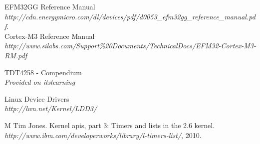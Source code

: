 
\begin{thebibliography}{9}

  EFM32GG Reference Manual\\
  \emph{http://cdn.energymicro.com/dl/devices/pdf/d0053\_efm32gg\_reference\_manual.pdf}.\\

 Cortex-M3 Reference Manual\\
	\emph{http://www.silabs.com/Support\%20Documents/TechnicalDocs/EFM32-Cortex-M3-RM.pdf}

 TDT4258 - Compendium\\
	\emph{Provided on itslearning}

 Linux Device Drivers \\
	\emph{http://lwn.net/Kernel/LDD3/}
	
 M Tim Jones. Kernel apis, part 3: Timers and lists in the 2.6 kernel. \\ 
	\emph{http://www.ibm.com/developerworks/library/l-timers-list/}, 2010.

\end{thebibliography}